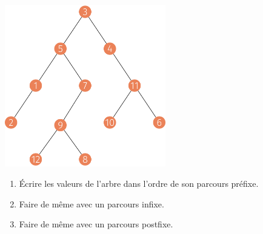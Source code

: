 \documentclass[a4paper,12pt,french]{article}
\begin{document}
\begin{exercice}
    \begin{center}
        \includegraphics[width=7cm]{img/arbre2}
    \end{center}
\begin{enumerate}
    \item \'Ecrire les valeurs de l'arbre dans l'ordre de son parcours préfixe.
    \item Faire de même avec un parcours infixe.
    \item Faire de même avec un parcours postfixe.
\end{enumerate}
\end{exercice}
\end{document}
